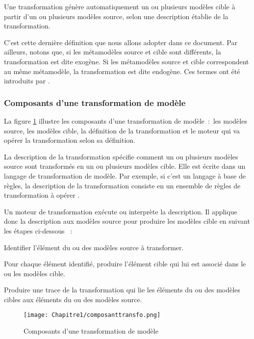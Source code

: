 \begin{theorem}
Une transformation génère automatiquement un ou plusieurs modèles cible à partir 
d'un ou plusieurs modèles source, selon une description établie de la 
transformation. 
\end{theorem}

C'est cette dernière définition que nous allons adopter dans ce document. Par 
ailleurs, notons que, si les métamodèles source et cible sont différents, la 
transformation est dite exogène. Si les métamodèles source et cible 
correspondent au même métamodèle, la transformation est dite endogène. Ces 
termes ont été introduits par \cite{mens2006taxonomy}.

\subsubsection{Composants d'une transformation de modèle} 
La figure \ref{fig:composantTransfo} illustre les composants d'une 
transformation de modèle~:~les modèles source, les modèles cible, la définition 
de la transformation et le moteur qui va opérer la transformation selon sa 
définition. 

La description de la transformation spécifie comment un ou plusieurs modèles 
source sont transformés en un ou plusieurs modèles cible. Elle est écrite dans 
un langage de transformation de modèle. Par exemple, si c'est un langage à base 
de règles, la description de la transformation consiste en un ensemble de règles 
de transformation à opérer \cite{kleppe2003mda}. 

Un moteur de transformation exécute ou interprète la description. Il applique 
donc la description aux modèles source pour produire les modèles cible en 
suivant les étapes ci-dessous \cite{tratt2005model}~:

\begin{bulletList}
\item Identifier l'élément du ou des modèles source à transformer.
\item Pour chaque élément identifié, produire l'élément cible qui lui est 
associé dans le ou les modèles cible.
\item Produire une trace de la transformation qui lie les éléments du ou des 
modèles cibles aux éléments du ou des modèles source.
\end{bulletList}

\begin{figure}[!htbp]
 \begin{center}
   \texttt{[image: Chapitre1/composanttransfo.png]}
 \end{center}
 \caption{Composants d'une transformation de modèle}
 \label{fig:composantTransfo}
\end{figure}

